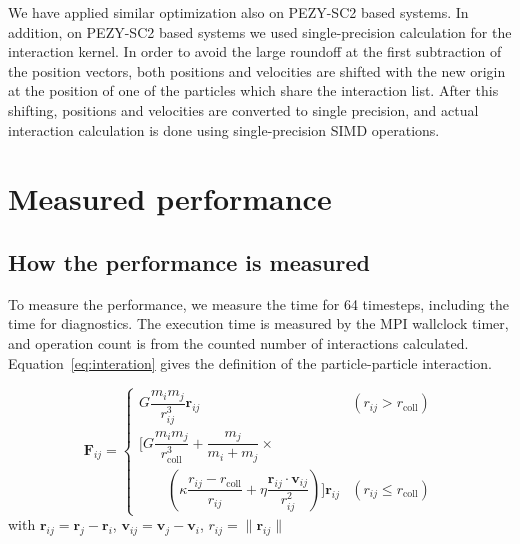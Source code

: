\documentclass[conference]{IEEEtran}
\begin{document}
We have applied similar optimization also on PEZY-SC2 based
systems. In addition, on PEZY-SC2 based systems we used
single-precision calculation for the interaction kernel. In order to
avoid the large roundoff at the first subtraction of the position
vectors, both positions and velocities are shifted with the new origin
at the position of one of the particles which share the interaction
list.  After this shifting, positions and velocities are converted to
single precision, and actual interaction calculation is done using
single-precision SIMD operations.


\section{Measured performance}
\label{sect:performance}
\subsection{How the performance is measured}


To measure the performance, we measure the time for 64 timesteps,
including the time for  diagnostics. 
The
execution time is measured by the MPI wallclock timer, and operation
count is from the counted number of interactions
calculated. Equation~\ref{eq:interation}  gives the definition of the
particle-particle interaction. 

{%
\begin{equation}
  \bm F_{ij} = \begin{cases} G \dfrac{m_i m_j}
    {r_{ij}^3} \bm r_{ij} & \left(r_{ij} > r_\text{coll} \right)
    \\
    \Biggl[  G \dfrac{m_i m_j} {r_\text{coll}^3}  + \dfrac{m_j}{m_i
        + m_j}  \times \\ \qquad  \left(      \kappa \dfrac{r_{ij} -
        r_\text{coll}}{r_{ij}}    + \eta \dfrac{\bm r_{ij} \cdot \bm
        v_{ij}}{r_{ij}^2}    \right) \Biggr] \bm r_{ij} & \left(
    r_{ij} \le r_\text{coll} \right) \end{cases}
  \label{eq:interation} 
\end{equation}
}
with
$\bm r_{ij} = \bm r_j - \bm r_i$, $\bm v_{ij} = \bm v_j - \bm v_i$,
$r_{ij} = \| \bm r_{ij} \|$
\end{document}

